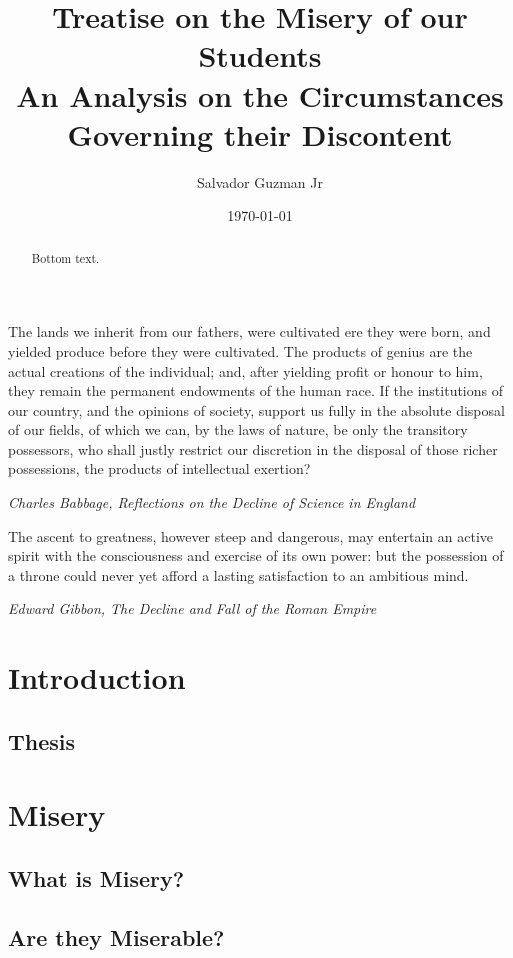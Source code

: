 \documentclass[UTF8]{article}
\title{%
	Treatise on the Misery of our Students\\
	\large An Analysis on the Circumstances Governing their Discontent
}
\author{Salvador Guzman Jr}
\date{\today}
\begin{document}
	\maketitle
	\newpage

	\begin{abstract}
		Bottom text.
	\end{abstract}

	\newpage

	\begin{center}
		\epigraph{
			The lands we inherit from our fathers, were cultivated ere they were born, and yielded produce before they were cultivated. The products of genius are the actual creations of the individual; and, after yielding profit or honour to him, they remain the permanent endowments of the human race. If the institutions of our country, and the opinions of society, support us fully in the absolute disposal of our fields, of which we can, by the laws of nature, be only the transitory possessors, who shall justly restrict our discretion in the disposal of those richer possessions, the products of intellectual exertion?
		}{\textit{Charles Babbage, Reflections on the Decline of Science in England}}
		\epigraph{
			The ascent to greatness, however steep and dangerous, may entertain an active spirit with the consciousness and exercise of its own power: but the possession of a throne could never yet afford a lasting satisfaction to an ambitious mind.
		}{\textit{Edward Gibbon, The Decline and Fall of the Roman Empire}}
	\end{center}

	\newpage
	\tableofcontents
	\newpage
	
	\section{Introduction}
	\subsection{Thesis}
	\section{Misery}
	\subsection{What is Misery?}
	\subsection{Are they Miserable?}
\end{document}
